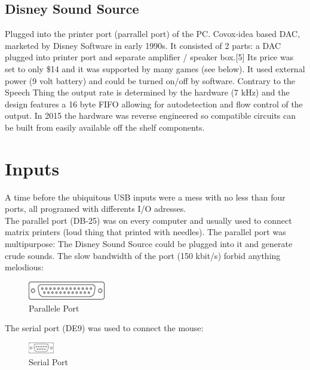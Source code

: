 \documentclass[book.tex]{subfiles}
\begin{document}
  \subsection{Disney Sound Source}
  Plugged into the printer port (parrallel port) of the PC. Covox-idea based DAC, marketed by Disney Software in early 1990s. It consisted of 2 parts: a DAC plugged into printer port and separate amplifier / speaker box.[5] Its price was set to only \$14 and it was supported by many games (see below). It used external power (9 volt battery) and could be turned on/off by software. Contrary to the Speech Thing the output rate is determined by the hardware (7 kHz) and the design features a 16 byte FIFO allowing for autodetection and flow control of the output. In 2015 the hardware was reverse engineered so compatible circuits can be built from easily available off the shelf components.












\section{Inputs}
A time before the ubiquitous USB inputs were a mess with no less than four ports, all programed with differents I/O adresses.\\

The parallel port (DB-25) was on every computer and usually used to connect matrix printers (loud thing that printed with needles). The parallel port was multipurpose: The Disney Sound Source could be plugged into it and generate crude sounds. The slow bandwidth of the port (150 kbit/s) forbid anything melodious:
 \begin{figure}[H]
\centering
\includegraphics[width=0.3\textwidth]{imgs/ports/DB-25_parallel_port.eps}
%
\caption{Parallele Port}
\label{fig:parallelPort}
\end{figure}


The serial port (DE9) was used to connect the mouse:
 \begin{figure}[H]
\centering
\includegraphics[width=0.1\textwidth]{imgs/ports/DE9_serial_port.eps}
%
\caption{Serial Port}
\label{fig:serialPort}
\end{figure}
\end{document}
